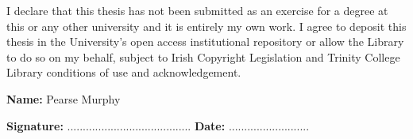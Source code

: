 \begin{abstracts}
\end{abstracts}


\restoregeometry





\begin{declaration}      

%
%
%
I declare that this thesis has not been submitted as an exercise for a degree at this or any other university and it is entirely my own work. 
I agree to deposit this thesis in the University’s open access institutional repository or allow the Library to do so on my behalf, subject to Irish Copyright Legislation and Trinity College Library conditions of use and acknowledgement.

\vspace{30mm}

\textbf{Name:} Pearse Murphy

\vspace{15mm}

\textbf{Signature:}  ........................................		\textbf{Date:}  ..........................

\end{declaration}

